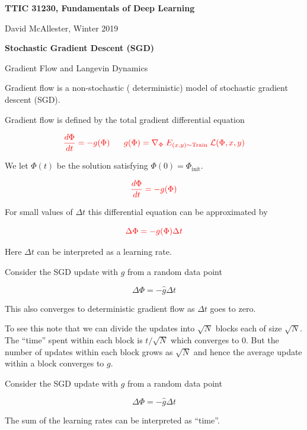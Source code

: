 


\newcommand{\solution}[1]{\bigskip {\bf Solution}: #1}



{\Huge
  \centerline{\bf TTIC 31230, Fundamentals of Deep Learning}
  \bigskip
  \centerline{David McAllester, Winter 2019}
  \vfill
  \centerline{\bf Stochastic Gradient Descent (SGD)}
  \vfill
  \vfill
  \centerline{Gradient Flow and Langevin Dynamics}
  \vfill


Gradient flow is a non-stochastic ({\color{red} deterministic}) model of {\color{red} stochastic} gradient descent (SGD).

\vfill
Gradient flow is defined by the {\color{red} total gradient} differential equation

$${\color{red} \frac{d \Phi}{d t} = - g(\Phi) \;\;\;\;\;\; g(\Phi) = \nabla_\Phi\; E_{(x,y) \sim \mathrm{Train}}\;{\cal L}(\Phi,x,y)}$$

\vfill
We let $\Phi(t)$ be the solution satisfying $\Phi(0) = \Phi_{\mathrm{init}}$.

$${\color{red} \frac{d \Phi}{d t} = - g(\Phi)}$$

\vfill
For small values of $\Delta t$ this differential equation can be approximated by

\vfill
$${\color{red} \Delta \Phi = - g(\Phi)\Delta t}$$

\vfill
Here $\Delta t$ can be interpreted as a learning rate.

Consider the SGD update with $\hat{g}$ from a random data point


{\color{red} $$\Delta \Phi = - \hat{g}\Delta t$$}

\vfill
This also converges to deterministic gradient flow as $\Delta t$ goes to zero.

\vfill
To see this note that we can divide the updates into $\sqrt{N}$ blocks each of size $\sqrt{N}$.  The ``time'' spent within each block is $t/\sqrt{N}$ which converges to 0.
But the number of updates within each block grows as $\sqrt{N}$ and hence the average update within a block converges to $g$.

Consider the SGD update with $\hat{g}$ from a random data point


{\color{red} $$\Delta \Phi = - \hat{g}\Delta t$$}

\vfill
The sum of the learning rates can be interpreted as ``time''.

}
